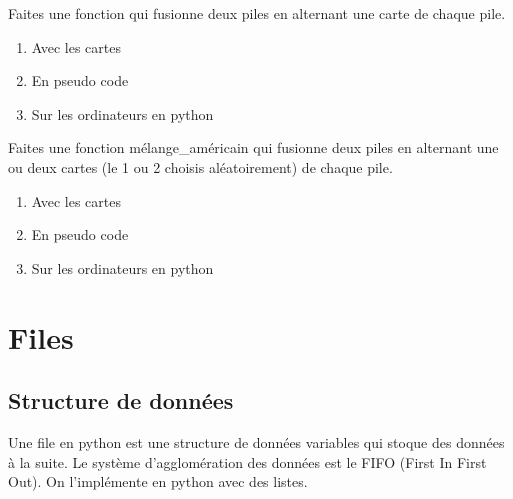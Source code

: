 \documentclass[12pt,fleqn]{article} %
\begin{document}
\begin{exercise}
Faites une fonction qui fusionne deux piles en alternant une carte de chaque pile.
\begin{enumerate}
	\item Avec les cartes
	\item En pseudo code
	\item Sur les ordinateurs en python
\end{enumerate}
\end{exercise}

\begin{exercise}
Faites une fonction mélange\_américain qui fusionne deux piles en alternant une ou deux cartes (le 1 ou 2 choisis aléatoirement) de chaque pile. 
\begin{enumerate}
	\item Avec les cartes
	\item En pseudo code
	\item Sur les ordinateurs en python
\end{enumerate}
\end{exercise}


\section{Files}

\subsection{Structure de données}

Une file en python est une structure de données variables qui stoque des données à la suite. Le système d'agglomération des données est le FIFO (First In First Out). On l'implémente en python avec des listes. \\
\end{document}
